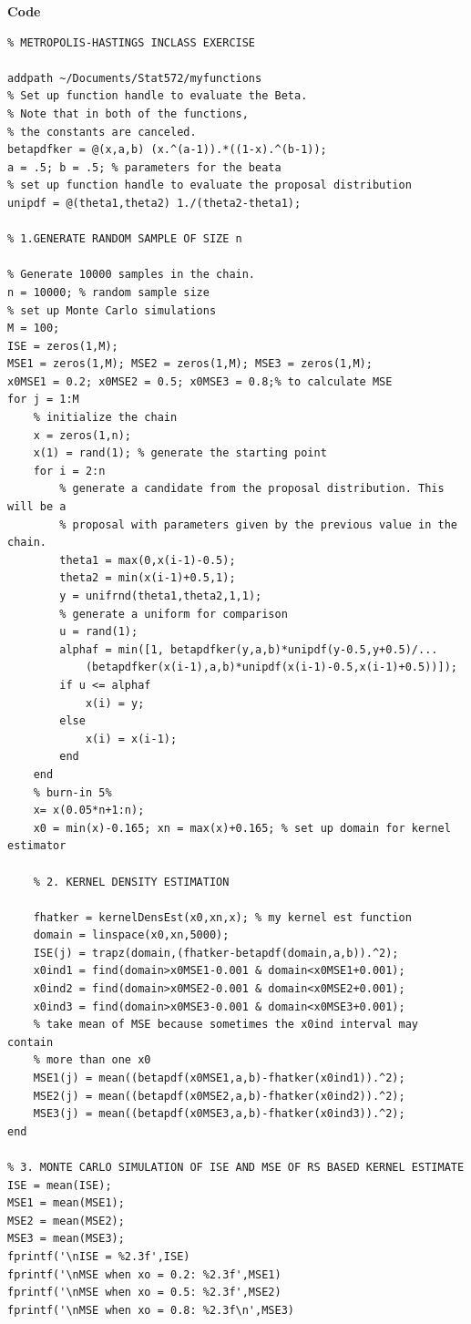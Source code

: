 \documentclass[12pt,a4paper]{article}
\begin{document}
\textbf{Code}
\begin{verbatim}
% METROPOLIS-HASTINGS INCLASS EXERCISE

addpath ~/Documents/Stat572/myfunctions
% Set up function handle to evaluate the Beta.
% Note that in both of the functions, 
% the constants are canceled.
betapdfker = @(x,a,b) (x.^(a-1)).*((1-x).^(b-1));
a = .5; b = .5; % parameters for the beata
% set up function handle to evaluate the proposal distribution
unipdf = @(theta1,theta2) 1./(theta2-theta1);

% 1.GENERATE RANDOM SAMPLE OF SIZE n

% Generate 10000 samples in the chain.
n = 10000; % random sample size
% set up Monte Carlo simulations
M = 100;
ISE = zeros(1,M);
MSE1 = zeros(1,M); MSE2 = zeros(1,M); MSE3 = zeros(1,M);
x0MSE1 = 0.2; x0MSE2 = 0.5; x0MSE3 = 0.8;% to calculate MSE
for j = 1:M
    % initialize the chain
    x = zeros(1,n);
    x(1) = rand(1); % generate the starting point
    for i = 2:n
        % generate a candidate from the proposal distribution. This will be a
        % proposal with parameters given by the previous value in the chain.
        theta1 = max(0,x(i-1)-0.5);
        theta2 = min(x(i-1)+0.5,1);
        y = unifrnd(theta1,theta2,1,1);
        % generate a uniform for comparison
        u = rand(1);
        alphaf = min([1, betapdfker(y,a,b)*unipdf(y-0.5,y+0.5)/...
            (betapdfker(x(i-1),a,b)*unipdf(x(i-1)-0.5,x(i-1)+0.5))]);
        if u <= alphaf
            x(i) = y;
        else
            x(i) = x(i-1);
        end
    end
    % burn-in 5%
    x= x(0.05*n+1:n);
    x0 = min(x)-0.165; xn = max(x)+0.165; % set up domain for kernel estimator
    
    % 2. KERNEL DENSITY ESTIMATION
    
    fhatker = kernelDensEst(x0,xn,x); % my kernel est function
    domain = linspace(x0,xn,5000);
    ISE(j) = trapz(domain,(fhatker-betapdf(domain,a,b)).^2);
    x0ind1 = find(domain>x0MSE1-0.001 & domain<x0MSE1+0.001);
    x0ind2 = find(domain>x0MSE2-0.001 & domain<x0MSE2+0.001);
    x0ind3 = find(domain>x0MSE3-0.001 & domain<x0MSE3+0.001);
    % take mean of MSE because sometimes the x0ind interval may contain 
    % more than one x0
    MSE1(j) = mean((betapdf(x0MSE1,a,b)-fhatker(x0ind1)).^2);
    MSE2(j) = mean((betapdf(x0MSE2,a,b)-fhatker(x0ind2)).^2);
    MSE3(j) = mean((betapdf(x0MSE3,a,b)-fhatker(x0ind3)).^2);
end

% 3. MONTE CARLO SIMULATION OF ISE AND MSE OF RS BASED KERNEL ESTIMATE
ISE = mean(ISE);
MSE1 = mean(MSE1);
MSE2 = mean(MSE2);
MSE3 = mean(MSE3);
fprintf('\nISE = %2.3f',ISE)
fprintf('\nMSE when xo = 0.2: %2.3f',MSE1)
fprintf('\nMSE when xo = 0.5: %2.3f',MSE2)
fprintf('\nMSE when xo = 0.8: %2.3f\n',MSE3)


\end{verbatim}
\end{document}
